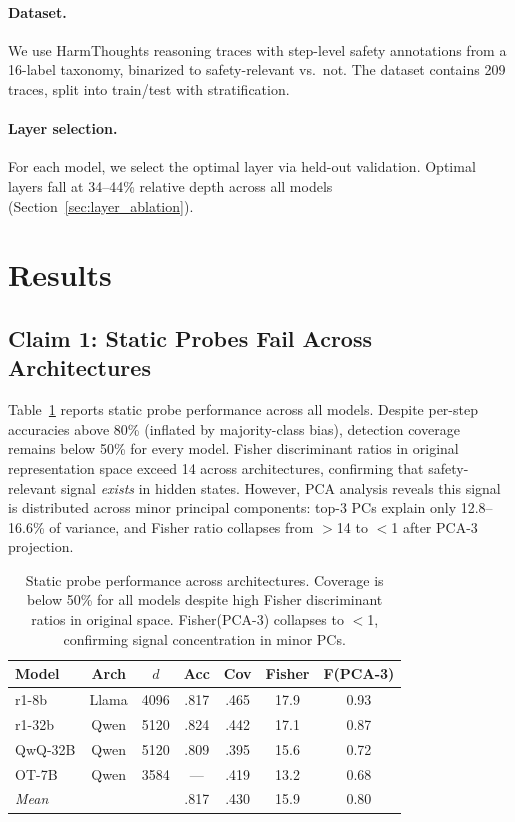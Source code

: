 \documentclass[11pt,a4paper]{article}
\begin{document}
\paragraph{Dataset.} We use HarmThoughts reasoning traces with step-level safety annotations from a 16-label taxonomy, binarized to safety-relevant vs.\ not.
The dataset contains 209 traces, split into train/test with stratification.

\paragraph{Layer selection.} For each model, we select the optimal layer via held-out validation.
Optimal layers fall at 34--44\% relative depth across all models (Section~\ref{sec:layer_ablation}).

\section{Results}

\subsection{Claim 1: Static Probes Fail Across Architectures}

Table~\ref{tab:static} reports static probe performance across all models.
Despite per-step accuracies above 80\% (inflated by majority-class bias), detection coverage remains below 50\% for every model.
Fisher discriminant ratios in original representation space exceed 14 across architectures, confirming that safety-relevant signal \emph{exists} in hidden states.
However, PCA analysis reveals this signal is distributed across minor principal components: top-3 PCs explain only 12.8--16.6\% of variance, and Fisher ratio collapses from $>$14 to $<$1 after PCA-3 projection.

\begin{table}[t]
\centering
\small
\begin{tabular}{lcccccc}
\toprule
\textbf{Model} & \textbf{Arch} & $d$ & \textbf{Acc} & \textbf{Cov} & \textbf{Fisher} & \textbf{F(PCA-3)} \\
\midrule
r1-8b & Llama & 4096 & .817 & .465 & 17.9 & 0.93 \\
r1-32b & Qwen & 5120 & .824 & .442 & 17.1 & 0.87 \\
QwQ-32B & Qwen & 5120 & .809 & .395 & 15.6 & 0.72 \\
OT-7B & Qwen & 3584 & --- & .419 & 13.2 & 0.68 \\
\midrule
\multicolumn{3}{l}{\textit{Mean}} & .817 & .430 & 15.9 & 0.80 \\
\bottomrule
\end{tabular}
\caption{Static probe performance across architectures.  Coverage is below 50\% for all models despite high Fisher discriminant ratios in original space.  Fisher(PCA-3) collapses to $<$1, confirming signal concentration in minor PCs.}
\label{tab:static}
\end{table}
\end{document}
